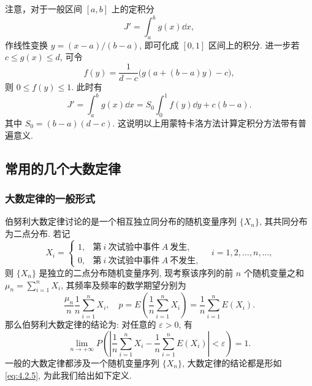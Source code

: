 \begin{example}
    注意，对于一般区间 $ [a, b] $ 上的定积分
    \begin{equation*}
        J' = \int_a^b g (x) \dd x,
    \end{equation*}
    作线性变换 $ y=(x-a)/(b-a) $, 即可化成 $ [0, 1] $ 区间上的积分.
    进一步若 $ c \leq g(x) \leq d$, 可令
    \begin{equation*}
        f (y) = \frac{1}{d-c} \bigl( g ( a + ( b - a ) y ) - c \bigr),
    \end{equation*}
    则 $ 0 \leq f (y) \leq 1 $.
    此时有
    \begin{equation*}
        J' = \int_a^b g (x) \dd x = S_0 \int_0^1 f (y) \dd y + c ( b - a ).
    \end{equation*}
    其中 $ S_0 = ( b -a ) ( d - c ) $.
    这说明以上用蒙特卡洛方法计算定积分方法带有普遍意义.
\end{example}

\subsection{常用的几个大数定律}

\subsubsection{大数定律的一般形式}

伯努利大数定律讨论的是一个相互独立同分布的随机变量序列 $ \{ X_n \} $, 其共同分布为二点分布.
若记
\begin{equation*}
    X_i =
    \begin{cases}
        1, & \text{第} \ i \ \text{次试验中事件} \ A \ \text{发生},\\
        0, & \text{第} \ i \ \text{次试验中事件} \ A \ \text{不发生},
    \end{cases}
    \quad i=1,2,\dotsc,n,\dotsc,
\end{equation*}
则 $ \{ X_n \} $ 是独立的二点分布随机变量序列, 现考察该序列的前 $ n $ 个随机变量之和 $ \mu_n = \sum_{i=1}^n X_i $, 其频率及频率的数学期望分别为
\begin{equation*}
    \frac{\mu_n}{n} \frac{1}{n} \sum_{i=1}^n X_i, \quad p = E \left( \frac{1}{n} \sum_{i=1}^n X_i \right) = \frac{1}{n} \sum_{i=1}^n E (X_i).
\end{equation*}
那么伯努利大数定律的结论为: 对任意的 $ \varepsilon > 0 $, 有
\begin{equation}\label{eq:4.2.5}
    \lim_{n \to +\infty} P \left( \left\lvert \frac{1}{n} \sum_{i=1}^n X_i - \frac{1}{n} \sum_{i=1}^n E (X_i) \right\rvert < \varepsilon \right) = 1.
\end{equation}
一般的大数定律都涉及一个随机变量序列 $ \{ X_n \} $, 大数定律的结论都是形如 \eqref{eq:4.2.5}, 为此我们给出如下定义.

